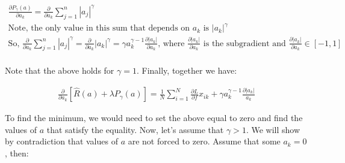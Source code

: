 \documentclass[11pt]{article}
\begin{document}
\begin{gather*}
\frac{\partial P_{\gamma} (a)}{\partial a_{k}} = 
\frac{\partial}{\partial a_{k}} \sum_{j = 1}^{n} |a_{j}|^{\gamma}\\
\text{Note, the only value in this sum that depends on } a_{k} 
\text{ is } |a_{k}|^{\gamma}\\
\text{So, } \frac{\partial}{\partial a_{k}} \sum_{j = 1}^{n} |a_{j}|^{\gamma} = 
\frac{\partial}{\partial a_{k}} |a_{k}|^{\gamma} = 
\gamma a_{k}^{\gamma - 1} \frac{\partial |a_{k}|}{\partial a_{k}} 
\text{, where } \frac{\partial |a_{k}|}{\partial a_{k}} 
\text{ is the subgradient and } 
\frac{\partial |a_{k}|}{\partial a_{k}} \in [-1, 1]\\
\end{gather*}

\newpage

\noindent
Note that the above holds for $\gamma = 1$. Finally, together we have:

\begin{gather*}
\frac{\partial}{\partial a_{k}} [\hat{R}(a) + \lambda P_{\gamma}(a)] = 
\frac{1}{N} \sum_{i = 1}^{N} \frac{\partial L}{\partial f} x_{ik} + 
\gamma a_{k}^{\gamma - 1} \frac{\partial |a_{k}|}{a_{k}}
\end{gather*}

\vspace{5mm}
\noindent
To find the minimum, we would need to set the above equal to zero and find the 
values of $a$ that satisfy the equality. Now, let's assume that $\gamma > 1$. 
We will show by contradiction that values of $a$ are not forced to zero. Assume that some $a_{k} = 0$, then:
\end{document}
